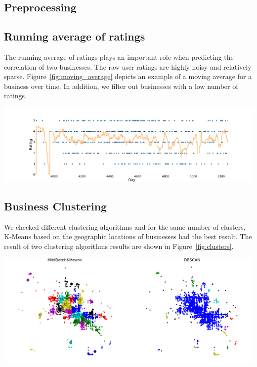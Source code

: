 \documentclass[a0,landscape,beamer]{a0poster}
\begin{document}
\begin{multicols}{4}
\section*{Preprocessing}
\subsection*{Running average of ratings}
The running average of ratings plays an important role when predicting the correlation of two businesses.
The raw user ratings are highly noisy and relatively sparse.
Figure~\ref{fig:moving_average} depicts an example of a moving average for a business over time.
In addition, we filter out businesses with a low number of ratings.

\begin{center}\vspace{1cm}
\includegraphics[width=1\linewidth]{../moving_avg.pdf}
\label{fig:moving_average}
\end{center}\vspace{1cm}
 

\subsection*{Business Clustering}
We checked different clustering algorithms and for the same number of clusters, K-Means based on the geographic locations of businesses had the best result. The result of two clustering algorithms results are shown in Figure~\ref{fig:clusters}.
\begin{center}\vspace{1cm}
\includegraphics[width=1\linewidth]{clusters.png}
\label{fig:clusters}
\end{center}\vspace{1cm}


\end{multicols}
\end{document}
